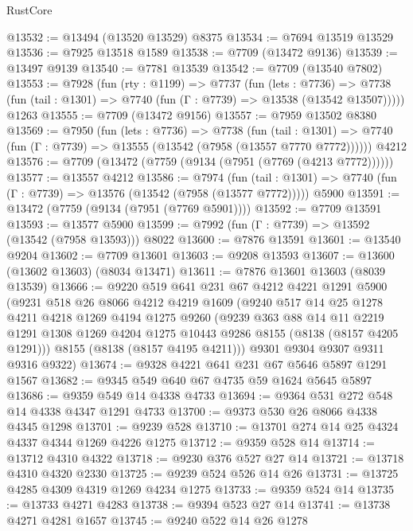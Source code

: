 \begin{lexlean}{RustCore}
\begin{coremodule}
@13532 := @13494 (@13520 @13529) @8375
@13534 := @7694 @13519 @13529
@13536 := @7925 @13518 @1589
@13538 := @7709 (@13472 @9136)
@13539 := @13497 @9139
@13540 := @7781 @13539
@13542 := @7709 (@13540 @7802)
@13553 := @7928
    (fun (rty : @1199) =>
    @7737
      (fun (lets : @7736) =>
      @7738 (fun (tail : @1301) => @7740 (fun (Γ : @7739) => @13538 (@13542 @13507)))))
    @1263
@13555 := @7709 (@13472 @9156)
@13557 := @7959 @13502 @8380
@13569 := @7950
    (fun (lets : @7736) =>
    @7738
      (fun (tail : @1301) =>
      @7740 (fun (Γ : @7739) => @13555 (@13542 (@7958 (@13557 @7770 @7772))))))
    @4212
@13576 := @7709 (@13472 (@7759 (@9134 (@7951 (@7769 (@4213 @7772))))))
@13577 := @13557 @4212
@13586 := @7974
    (fun (tail : @1301) => @7740 (fun (Γ : @7739) => @13576 (@13542 (@7958 (@13577 @7772)))))
    @5900
@13591 := @13472 (@7759 (@9134 (@7951 (@7769 @5901))))
@13592 := @7709 @13591
@13593 := @13577 @5900
@13599 := @7992 (fun (Γ : @7739) => @13592 (@13542 (@7958 @13593))) @8022
@13600 := @7876 @13591
@13601 := @13540 @9204
@13602 := @7709 @13601
@13603 := @9208 @13593
@13607 := @13600 (@13602 @13603) (@8034 @13471)
@13611 := @7876 @13601 @13603 (@8039 @13539)
@13666 := @9220
    @519
    @641
    @231
    @67
    @4212
    @4221
    @1291
    @5900
    (@9231
      @518
      @26
      @8066
      @4212
      @4219
      @1609
      (@9240
        @517
        @14
        @25
        @1278
        @4211
        @4218
        @1269
        @4194
        @1275
        @9260
        (@9239
          @363
          @88
          @14
          @11
          @2219
          @1291
          @1308
          @1269
          @4204
          @1275
          @10443
          @9286
          @8155
          (@8138 (@8157 @4205 @1291)))
        @8155
        (@8138 (@8157 @4195 @4211)))
      @9301
      @9304
      @9307
      @9311
      @9316
      @9322)
@13674 := @9328 @4221 @641 @231 @67 @5646 @5897 @1291 @1567
@13682 := @9345 @549 @640 @67 @4735 @59 @1624 @5645 @5897
@13686 := @9359 @549 @14 @4338 @4733
@13694 := @9364 @531 @272 @548 @14 @4338 @4347 @1291 @4733
@13700 := @9373 @530 @26 @8066 @4338 @4345 @1298
@13701 := @9239 @528
@13710 := @13701 @274 @14 @25 @4324 @4337 @4344 @1269 @4226 @1275
@13712 := @9359 @528 @14
@13714 := @13712 @4310 @4322
@13718 := @9230 @376 @527 @27 @14
@13721 := @13718 @4310 @4320 @2330
@13725 := @9239 @524 @526 @14 @26
@13731 := @13725 @4285 @4309 @4319 @1269 @4234 @1275
@13733 := @9359 @524 @14
@13735 := @13733 @4271 @4283
@13738 := @9394 @523 @27 @14
@13741 := @13738 @4271 @4281 @1657
@13745 := @9240 @522 @14 @26 @1278

\end{coremodule}
\end{lexlean}
